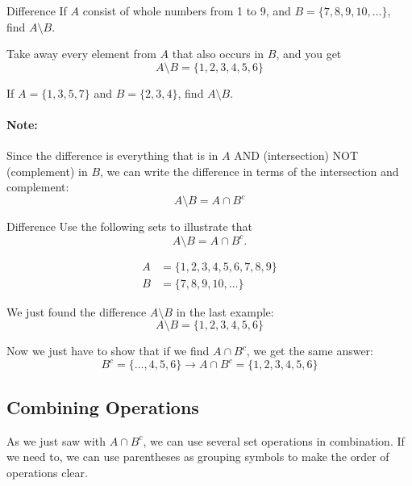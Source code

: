\begin{example}[https://www.youtube.com/watch?v=XZrZRxQ8Axo&list=PLfmpjsIzhztuvrh-T2Owgo_gO84qypSBG&index=14]{Difference}
If $A$ consist of whole numbers from 1 to 9, and $B = \{7,8,9,10,\ldots\}$, find $A \setminus B$.

\sol
Take away every element from $A$ that also occurs in $B$, and you get
\[\boxed{A \setminus B = \{1,2,3,4,5,6\}}\]
\end{example}

\begin{try}
If $A=\{1,3,5,7\}$ and $B=\{2,3,4\}$, find $A \setminus B$.
\end{try}

\paragraph{Note:} Since the difference is everything that is in $A$ AND (intersection) NOT (complement) in $B$, we can write the difference in terms of the intersection and complement:
\[A \setminus B = A \cap B^c\]
\pagebreak

\begin{example}[https://www.youtube.com/watch?v=TYFOyfN9hnw&list=PLfmpjsIzhztuvrh-T2Owgo_gO84qypSBG&index=15]{Difference}
Use the following sets to illustrate that \[A \setminus B = A \cap B^c.\]

\begin{align*}
A &= \{1,2,3,4,5,6,7,8,9\}\\
B &= \{7,8,9,10,\ldots\}
\end{align*}

\sol
We just found the difference $A \setminus B$ in the last example:
\[A \setminus B = \{1,2,3,4,5,6\}\]

Now we just have to show that if we find $A \cap B^c$, we get the same answer:
\[B^c = \{\ldots, 4,5,6\} \longrightarrow A \cap B^c = \{1,2,3,4,5,6\}\]

\end{example}

\subsection{Combining Operations}
As we just saw with $A \cap B^c$, we can use several set operations in combination.  If we need to, we can use parentheses as grouping symbols to make the order of operations clear.

